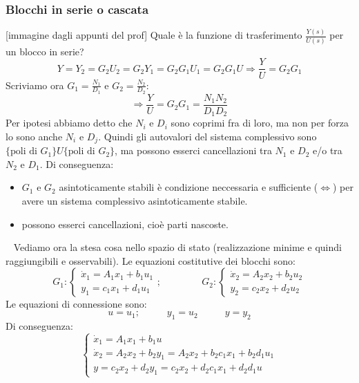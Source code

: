 \subsubsection{Blocchi in serie o cascata}
[immagine dagli appunti del prof]\newline
Quale è la funzione di trasferimento $\frac{Y(s)}{U(s)}$ per un blocco in serie?
\[
    Y= Y_2 = G_2U_2 = G_2 Y_1 = G_2G_1 U_1 = G_2G_1 U \Longrightarrow \frac{Y}{U} = G_2G_1
\]
Scriviamo ora $G_1 = \frac{N_1}{D_1}$ e $G_2= \frac{N_2}{D_2}$:
\[
    \Longrightarrow \frac{Y}{U} = G_2 G_1 = \frac{N_1N_2}{D_1D_2}
\]
Per ipotesi abbiamo detto che $N_i$ e $D_i$ sono coprimi fra di loro, ma non per forza lo sono anche $N_i$ e $D_j$.\newline
Quindi gli autovalori del sistema complessivo sono $\{\text{poli di $G_1$}\} U \{\text{poli di $G_2$}\}$, ma possono esserci cancellazioni tra $N_1$ e $D_2$ e/o tra $N_2$ e $D_1$.\newline
Di conseguenza:
\begin{itemize}
    \item $G_1$ e $G_2$ asintoticamente stabili è condizione neccessaria e sufficiente ($\Leftrightarrow$) per avere un sistema complessivo asintoticamente stabile.
    \item possono esserci cancellazioni, cioè parti nascoste.
\end{itemize} 
\ \newline
Vediamo ora la stesa cosa nello spazio di stato (realizzazione minime e quindi raggiungibili e osservabili).
Le equazioni costitutive dei blocchi sono:
\[
    G_1: \begin{cases}
        \dot{x}_1 = A_1 x_1 + b_1 u_1\\
        y_1 = c_1 x_1 + d_1 u_1
    \end{cases}; \;\;\;\;\;\;\;\;\;\;\;\;\;\;\;G_2 : \begin{cases}
        \dot{x}_2 = A_2 x_2 + b_2 u_2\\
        y_2 = c_2 x_2 + d_2 u_2
    \end{cases}
\]
Le equazioni di connessione sono:
\[
    u = u_1; \;\;\;\;\;\;\;\;\;\;y_1 = u_2 \;\;\;\;\;\;\;\;\;\;y=y_2
\]
Di conseguenza:
\[
    \begin{cases}
        \dot{x}_1 = A_1 x_1 + b_1 u\\
        \dot{x}_2 = A_2 x_2 + b_2 y_1 = A_2 x_2 + b_2 c_1x_1 + b_2 d_1 u_1\\
        y = c_2 x_2 + d_2 y_1 = c_2 x_2 + d_2 c_1 x_1 + d_2 d_1 u
    \end{cases}
\]
